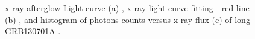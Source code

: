 \begin{figure}[hpbt]
\caption{x-ray  afterglow Light curve (a) , x-ray  light curve fitting - red line (b) , and histogram  of  photons counts  versus x-ray flux  (c)  of long GRB130701A .}
\end{figure}
